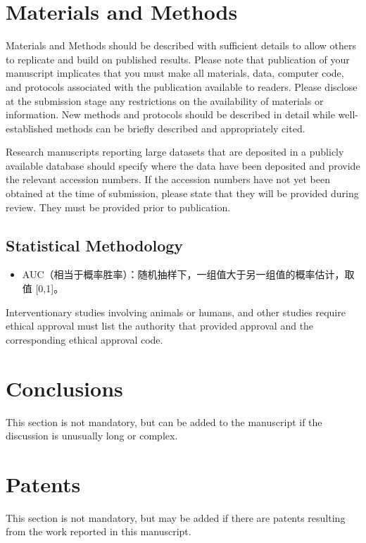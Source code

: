 \documentclass[sensors,article,submit,moreauthors]{Definitions/mdpi}
\begin{document}
\section{Materials and Methods}

Materials and Methods should be described with sufficient details to allow others to replicate and build on published results. Please note that publication of your manuscript implicates that you must make all materials, data, computer code, and protocols associated with the publication available to readers. Please disclose at the submission stage any restrictions on the availability of materials or information. New methods and protocols should be described in detail while well-established methods can be briefly described and appropriately cited.

Research manuscripts reporting large datasets that are deposited in a publicly available database should specify where the data have been deposited and provide the relevant accession numbers. If the accession numbers have not yet been obtained at the time of submission, please state that they will be provided during review. They must be provided prior to publication.

\subsection{Statistical Methodology}
\begin{itemize}[leftmargin=*]
  \item AUC（相当于概率胜率）：随机抽样下，一组值大于另一组值的概率估计，取值 [0,1]。
\end{itemize}

Interventionary studies involving animals or humans, and other studies require ethical approval must list the authority that provided approval and the corresponding ethical approval code. 

\section{Conclusions}

This section is not mandatory, but can be added to the manuscript if the discussion is unusually long or complex.

\section{Patents}
This section is not mandatory, but may be added if there are patents resulting from the work reported in this manuscript.
\end{document}
